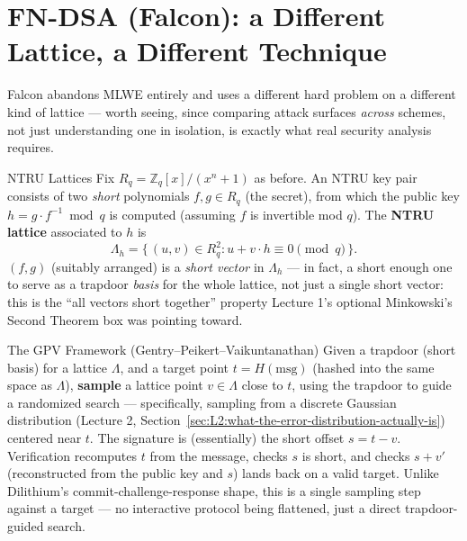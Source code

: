 \section{FN-DSA (Falcon): a Different Lattice, a Different Technique}
\label{sec:L4:fn-dsa-falcon-a-different-lattice-a-diff}

Falcon abandons MLWE entirely and uses a different hard problem on a different kind of lattice --- worth seeing, since comparing attack surfaces \emph{across} schemes, not just understanding one in isolation, is exactly what real security analysis requires.

\begin{defbox}{NTRU Lattices}
Fix $R_q = \mathbb{Z}_q[x]/(x^n+1)$ as before. An NTRU key pair consists of two \emph{short} polynomials $f,g \in R_q$ (the secret), from which the public key $h = g\cdot f^{-1} \bmod q$ is computed (assuming $f$ is invertible mod $q$). The \textbf{NTRU lattice} associated to $h$ is
$$
\Lambda_h = \{\, (u,v) \in R_q^2 : u + v\cdot h \equiv 0 \!\!\pmod q \,\}.
$$
$(f,g)$ (suitably arranged) is a \emph{short vector} in $\Lambda_h$ --- in fact, a short enough one to serve as a trapdoor \emph{basis} for the whole lattice, not just a single short vector: this is the ``all vectors short together'' property Lecture 1's optional Minkowski's Second Theorem box was pointing toward.
\end{defbox}

\begin{defbox}{The GPV Framework (Gentry--Peikert--Vaikuntanathan)}
Given a trapdoor (short basis) for a lattice $\Lambda$, and a target point $t = H(\text{msg})$ (hashed into the same space as $\Lambda$), \textbf{sample} a lattice point $v \in \Lambda$ close to $t$, using the trapdoor to guide a randomized search --- specifically, sampling from a discrete Gaussian distribution (Lecture 2, Section~\ref{sec:L2:what-the-error-distribution-actually-is}) centered near $t$. The signature is (essentially) the short offset $s = t - v$. Verification recomputes $t$ from the message, checks $s$ is short, and checks $s+v'$ (reconstructed from the public key and $s$) lands back on a valid target. Unlike Dilithium's commit-challenge-response shape, this is a single sampling step against a target --- no interactive protocol being flattened, just a direct trapdoor-guided search.
\end{defbox}

